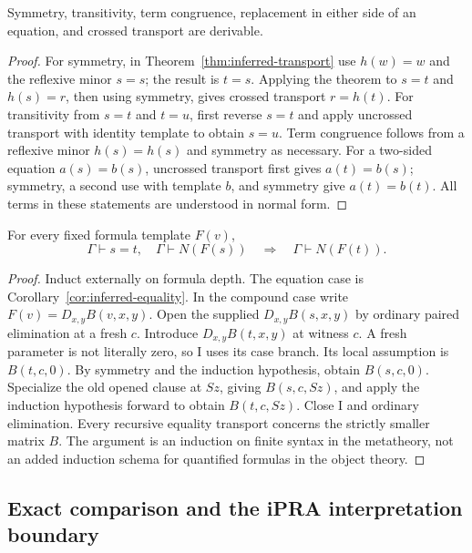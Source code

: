 \begin{corollary}
\label{cor:inferred-equality}
Symmetry, transitivity, term congruence, replacement in either side of an
equation, and crossed transport are derivable.
\end{corollary}
\begin{proof}
For symmetry, in Theorem~\ref{thm:inferred-transport} use $h(w)=w$ and
the reflexive minor $s=s$; the result is $t=s$. Applying the theorem to
$s=t$ and $h(s)=r$, then using symmetry, gives crossed transport
$r=h(t)$. For transitivity from $s=t$ and $t=u$, first reverse $s=t$ and
apply uncrossed transport with identity template to obtain $s=u$.
Term congruence follows from a reflexive minor $h(s)=h(s)$ and symmetry
as necessary. For a two-sided equation $a(s)=b(s)$, uncrossed transport
first gives $a(t)=b(s)$; symmetry, a second use with template $b$, and
symmetry give $a(t)=b(t)$. All terms in these statements are understood in
normal form.
\end{proof}

\begin{theorem}
\label{thm:inferred-formula-transport}
For every fixed formula template $F(v)$,
\[
 \Gamma\vdash s=t,\quad\Gamma\vdash N(F(s))
 \quad\Longrightarrow\quad\Gamma\vdash N(F(t)).
\]
\end{theorem}
\begin{proof}
Induct externally on formula depth. The equation case is
Corollary~\ref{cor:inferred-equality}. In the compound case write
$F(v)=D_{x,y}B(v,x,y)$. Open the supplied $D_{x,y}B(s,x,y)$ by ordinary
paired elimination at a fresh $c$. Introduce $D_{x,y}B(t,x,y)$ at witness
$c$. A fresh parameter is not literally zero, so I uses its case branch.
Its local assumption is $B(t,c,0)$. By symmetry and the induction
hypothesis, obtain $B(s,c,0)$. Specialize the old opened clause at $Sz$,
giving $B(s,c,Sz)$, and apply the induction hypothesis forward to obtain
$B(t,c,Sz)$. Close I and ordinary elimination. Every recursive equality
transport concerns the strictly smaller matrix $B$. The argument is an
induction on finite syntax in the metatheory, not an added induction schema
for quantified formulas in the object theory.
\end{proof}

\subsection{Exact comparison and the iPRA interpretation boundary}

